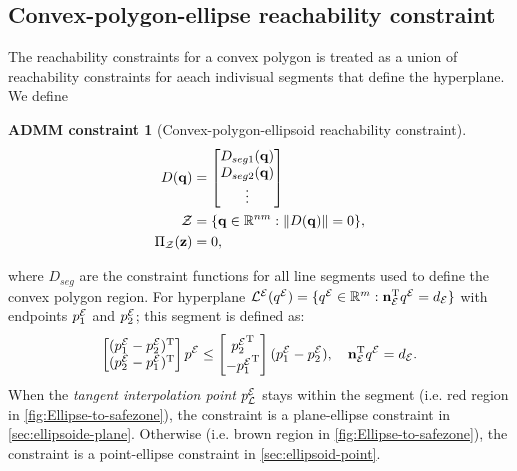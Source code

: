 \documentclass[10pt,twocolumn,twoside]{IEEEtran}
\newtheorem{constraint}{ADMM constraint}
\newcommand{\news}{\color{blue}}
\def\sZ{\mathcal{Z}}
\begin{document}
\subsection{Convex-polygon-ellipse reachability constraint}\label{sec:ellipse-region-constraint}
{\news  
The reachability constraints for a convex polygon is treated as a union of reachability constraints for aeach indivisual segments that define the hyperplane. We define
\begin{constraint}[Convex-polygon-ellipsoid reachability constraint]\label{constraint:polygon-ellipsoid}
\begin{align}
D(\vq) &= \bmat{D_{seg1}(\vq)\\D_{seg2}(\vq)\\ \vdots} \label{eq:region_ellipsoid_constraint}\\
  \sZ &= \{\vq\in\mathbb{R}^{nm}:\norm{D(\vq)} = 0 \},\\
   \Pi_\sZ(\vz) & = 0, 
\end{align}
\end{constraint}
where $D_{seg}$ are the constraint functions for all line segments used to define the convex polygon region. 
For hyperplane ${\mathcal{L}^{\mathcal{E}}}({q^{\mathcal{E}}}) = \{ {q^{\mathcal{E}}}\in\mathbb{R}^m:  \mathbf{n}_{\mathcal{E}}^\mathrm{T} {q^{\mathcal{E}}} = d_{\mathcal{E}}\}$ with endpoints ${p_1^{\mathcal{E}}}$ and ${p_2^{\mathcal{E}}}$; this segment is defined as:
\begin{equation}
\begin{bmatrix}({p_1^{\mathcal{E}}}- {p_2^{\mathcal{E}}})^\mathrm{T}\\( {p_2^{\mathcal{E}}} - {p_1^{\mathcal{E}}})^\mathrm{T}\end{bmatrix}  {p^{\mathcal{E}}} \leq \begin{bmatrix} {p_2^{\mathcal{E}}}^\mathrm{T}\\- {p_1^{\mathcal{E}}}^\mathrm{T}\end{bmatrix}( {p_1^{\mathcal{E}}}- {p_2^{\mathcal{E}}}), \quad \mathbf{n}_{\mathcal{E}}^\mathrm{T} {q^{\mathcal{E}}} = d_{\mathcal{E}}.
\end{equation}
When the \emph{tangent interpolation point} ${p_{\mathcal{L}}^{\mathcal{E}}}$ stays within the segment (i.e. red region in \cref{fig:Ellipse-to-safezone}), the constraint is a plane-ellipse constraint in \cref{sec:ellipsoide-plane}. Otherwise (i.e. brown region in \cref{fig:Ellipse-to-safezone}), the constraint is a point-ellipse constraint in \cref{sec:ellipsoid-point}.

}
\end{document}
